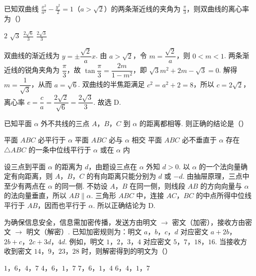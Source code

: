 \begin{problem}
已知双曲线 \(\frac{x^2}{a^2} - \frac{y^2}{2} = 1\)（\(a > \sqrt{2}\)）的两条渐近线的夹角为 \(\frac{\pi}{3}\)，则双曲线的离心率为（\quad）

\choices
    {\(2\)}
    {\(\sqrt{3}\)}
    {\(\frac{2\sqrt{6}}{3}\)}
    {\(\frac{2\sqrt{3}}{3}\)}
\end{problem}


\begin{solution}
双曲线的渐近线为 \(y=\pm\dfrac{\sqrt{2}}{a}x\). 由 \(a>\sqrt{2}\)，令 \(m=\dfrac{\sqrt{2}}{a}\)，则 \(0<m<1\). 两条渐近线的锐角夹角为 \(\dfrac\pi3\)，故 \(\tan\dfrac\pi3=\dfrac{2m}{1-m^{2}}\)，即 \(\sqrt{3}m^{2}+2m-\sqrt{3}=0\). 解得 \(m=\dfrac{1}{\sqrt{3}}\)，从而 \(a=\sqrt{6}\). 双曲线的半焦距满足 \(c^{2}=a^{2}+2=8\)，所以 \(c=2\sqrt{2}\)，离心率 \(e=\dfrac{c}{a}=\dfrac{2\sqrt{2}}{\sqrt{6}}=\dfrac{2\sqrt{3}}{3}\). 故选 D.
\end{solution}

\begin{problem}
已知平面 \(\alpha\) 外不共线的三点 \(A\)，\(B\)，\(C\) 到 \(\alpha\) 的距离都相等. 则正确的结论是（\quad）

\choices
    {平面 \(ABC\) 必平行于 \(\alpha\)}
    {平面 \(ABC\) 必与 \(\alpha\) 相交}
    {平面 \(ABC\) 必不垂直于 \(\alpha\)}
    {存在 \(\triangle ABC\) 的一条中位线平行于 \(\alpha\) 或在 \(\alpha\) 内}
\end{problem}


\begin{solution}
设三点到平面 \(\alpha\) 的距离为 \(d\)，由题设三点在 \(\alpha\) 外知 \(d>0\). 以 \(\alpha\) 的一个法向量确定有向距离，则 \(A\)，\(B\)，\(C\) 的有向距离只能分别为 \(d\) 或 \(-d\). 由抽屉原理，三点中至少有两点在 \(\alpha\) 的同一侧. 不妨设 \(A\)，\(B\) 在同一侧，则线段 \(AB\) 的方向向量与 \(\alpha\) 的法向量垂直，所以 \(AB\parallel\alpha\). 三角形 \(ABC\) 中，连接 \(AC\)，\(BC\) 的中点所得中位线平行于 \(AB\)，因而也平行于 \(\alpha\). 所以正确结论为 D.
\end{solution}

\begin{problem}
为确保信息安全，信息需加密传播，发送方由明文 \(\rightarrow\) 密文（加密），接收方由密文 \(\rightarrow\) 明文（解密）. 已知加密规则为：明文 \(a\)，\(b\)，\(c\)，\(d\) 对应密文 \(a + 2b\)，\(2b + c\)，\(2c + 3d\)，\(4d\). 例如，明文 \(1\)，\(2\)，\(3\)，\(4\) 对应密文 \(5\)，\(7\)，\(18\)，\(16\). 当接收方收到密文 \(14\)，\(9\)，\(23\)，\(28\) 时，则解密得到的明文为（\quad）

\choices
    {\(1\)，\(6\)，\(4\)，\(7\)}
    {\(4\)，\(6\)，\(1\)，\(7\)}
    {\(7\)，\(6\)，\(1\)，\(4\)}
    {\(6\)，\(4\)，\(1\)，\(7\)}
\end{problem}

